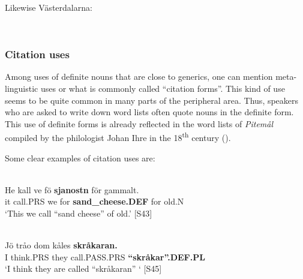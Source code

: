 
Likewise Västerdalarna:


\ea
	\\
	\z 
\z

\subsubsection{Citation uses}
 Among uses of definite nouns that are close to generics, one can mention meta-linguistic uses or what is commonly called “citation forms”. This kind of use seems to be quite common in many parts of the peripheral area. Thus, speakers who are asked to write down word lists often quote nouns in the definite form. This use of definite forms is already reflected in the word lists of \textit{Pitemål} compiled by the philologist Johan Ihre in the 18\textsuperscript{th} century (\citet{Reinhammar2002}). 

Some clear examples of citation uses are:

\ea \label{} 
\\
\gll 	He  kall  ve  fö  \textbf{sjanostn} för  gammalt.\\
		it  call.PRS  we  for  \textbf{sand\_cheese.DEF} for  old.N\\
\glt 	‘This we call “sand cheese” of old.’ [S43]

\z

\ea \label{} 
\\
\gll Jö  tråo  dom  kåles  \textbf{skråkaran.}\\
I  think.PRS  they  call.PASS.PRS  \textbf{“skråkar”.DEF.PL}\\
\glt ‘I think they are called “skråkaran” ‘ [S45]

